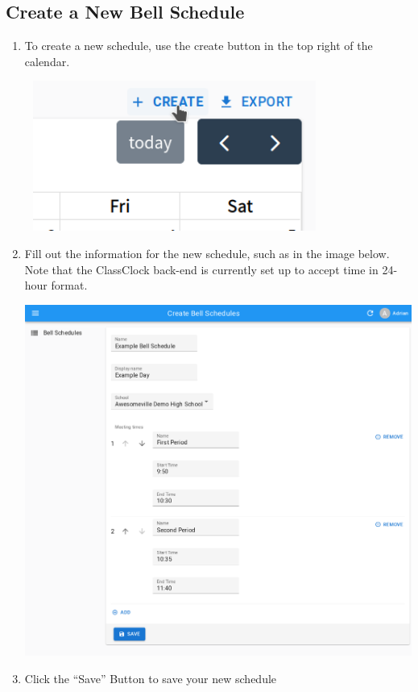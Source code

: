 \documentclass{article}
\begin{document}
\subsection{Create a New Bell Schedule}
\begin{enumerate}
\item {To create a new schedule, use the create button in the top right of the calendar.}
\begin{center}
\includegraphics[width=3.8693in,height=1.9382in]{images/click-create-schedule.png}
\end{center}
\item {Fill out the information for the new schedule, such as in the image below. Note that the ClassClock back-end is currently set up to accept time in 24-hour format.}
\begin{center}
\includegraphics[width=\textwidth]{images/new schedule.png}
\end{center}
\item {Click the “Save” Button to save your new schedule}
\end{enumerate}
\end{document}
